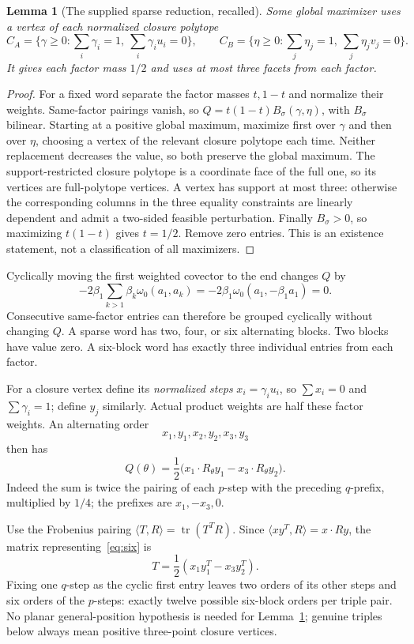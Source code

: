 \documentclass[11pt,a4paper]{article}
\newtheorem{lemma}[theorem]{Lemma}
\theoremstyle{definition}\newtheorem{definition}[theorem]{Definition}
\theoremstyle{remark}\newtheorem{remark}[theorem]{Remark}
\newcommand{\tr}{\operatorname{tr}}
\newcommand{\ip}[2]{\langle #1,#2\rangle}
\begin{document}
\begin{lemma}[The supplied sparse reduction, recalled]\label{lem:sparse}
Some global maximizer uses a vertex of each normalized closure polytope
\[
 C_A=\{\gamma\ge0:\sum_i\gamma_i=1,\ \sum_i\gamma_i u_i=0\},
 \qquad C_B=\{\eta\ge0:\sum_j\eta_j=1,\ \sum_j\eta_jv_j=0\}.
\]
It gives each factor mass $1/2$ and uses at most three facets from each factor.
\end{lemma}
\begin{proof}
For a fixed word separate the factor masses $t,1-t$ and normalize their weights. Same-factor pairings vanish, so $Q=t(1-t)B_\sigma(\gamma,\eta)$, with $B_\sigma$ bilinear. Starting at a positive global maximum, maximize first over $\gamma$ and then over $\eta$, choosing a vertex of the relevant closure polytope each time. Neither replacement decreases the value, so both preserve the global maximum. The support-restricted closure polytope is a coordinate face of the full one, so its vertices are full-polytope vertices. A vertex has support at most three: otherwise the corresponding columns in the three equality constraints are linearly dependent and admit a two-sided feasible perturbation. Finally $B_\sigma>0$, so maximizing $t(1-t)$ gives $t=1/2$. Remove zero entries. This is an existence statement, not a classification of all maximizers.
\end{proof}

Cyclically moving the first weighted covector to the end changes $Q$ by
\[
 -2\beta_1\sum_{k>1}\beta_k\omega_0(a_1,a_k)
 =-2\beta_1\omega_0(a_1,-\beta_1a_1)=0.
\]
Consecutive same-factor entries can therefore be grouped cyclically without changing $Q$. A sparse word has two, four, or six alternating blocks. Two blocks have value zero. A six-block word has exactly three individual entries from each factor.

For a closure vertex define its \emph{normalized steps} $x_i=\gamma_i u_i$, so $\sum x_i=0$ and $\sum\gamma_i=1$; define $y_j$ similarly. Actual product weights are half these factor weights. An alternating order
\[
 x_1,y_1,x_2,y_2,x_3,y_3
\]
then has
\begin{equation}\label{eq:six}
 Q(\theta)=\frac12\bigl(x_1\cdot R_\theta y_1-x_3\cdot R_\theta y_2\bigr).
\end{equation}
Indeed the sum is twice the pairing of each $p$-step with the preceding $q$-prefix, multiplied by $1/4$; the prefixes are $x_1,-x_3,0$.

Use the Frobenius pairing $\ip TR=\tr(T^TR)$. Since $\ip{xy^T}R=x\cdot Ry$, the matrix representing~\eqref{eq:six} is
\begin{equation}\label{eq:six-tensor}
 T=\frac12(x_1y_1^T-x_3y_2^T).
\end{equation}
Fixing one $q$-step as the cyclic first entry leaves two orders of its other steps and six orders of the $p$-steps: exactly twelve possible six-block orders per triple pair. No planar general-position hypothesis is needed for Lemma~\ref{lem:sparse}; genuine triples below always mean positive three-point closure vertices.
\end{document}
